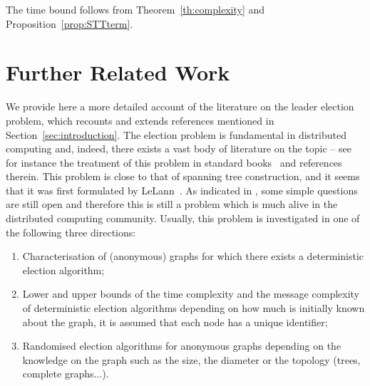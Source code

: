 \documentclass[11pt,envcountsame,letterpaper]{llncs}
\begin{document}
The time bound follows from Theorem~\ref{th:complexity} and Proposition~\ref{prop:STTterm}.


\section{Further Related Work}
\label{sec:related}

We provide here a more detailed account of the literature on the leader election problem, which recounts and extends references mentioned in Section~\ref{sec:introduction}. The election problem is fundamental in distributed computing and, indeed, there exists
a vast body of literature on the topic -- see for instance the treatment of this problem in standard books~\cite{Tel,Attiya,Lynch,Santoro} and references therein.
This problem is close to that of spanning tree construction, and it seems that it was first formulated by LeLann~\cite{LeLann}. 
As indicated in \cite{KPPRT15}, some simple questions are still open and therefore this is still a problem which is much alive in the distributed computing community.
Usually, this problem is investigated in one of the following three directions:
\begin{enumerate}
\item Characterisation of (anonymous) graphs for which there  exists a 
deterministic election algorithm;
\item Lower and upper bounds of the time complexity and the message
complexity of deterministic election algorithms
depending on how much is initially known about the graph, 
it is assumed that each node has a unique identifier;
\item Randomised election algorithms for anonymous graphs 
depending on the knowledge on the graph such as the size, the diameter
or the topology (trees, complete graphs...).
\end{enumerate}
\end{document}
